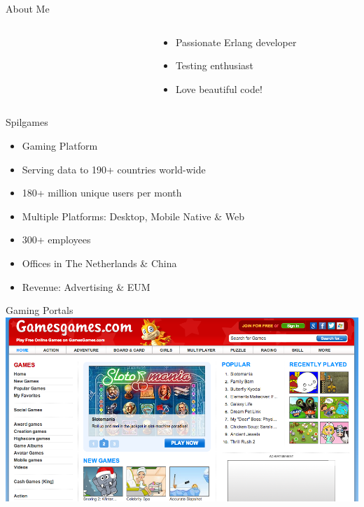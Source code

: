 \documentclass[aspectratio=169]{beamer}
\begin{document}
\begin{frame}{About Me}
\begin{columns}
\begin{column}[c]{0.2\textwidth}
        \end{column}
        \begin{column}[c]{0.05\textwidth}
        \end{column}
        \begin{column}[c]{0.7\textwidth}
            \begin{itemize}
                \item Passionate Erlang developer
                \item Testing enthusiast
                \item Love beautiful code!
            \end{itemize}
        \end{column}
    \end{columns}
\end{frame}

\begin{frame}{Spilgames}
    \begin{itemize}
       \item Gaming Platform
       \item Serving data to 190+ countries world-wide
       \item 180+ million unique users per month
       \item Multiple Platforms: Desktop, Mobile Native \& Web
       \item 300+ employees
       \item Offices in The Netherlands \& China
       \item Revenue: Advertising \& EUM
    \end{itemize}
\end{frame}

\begin{frame}{Gaming Portals}
    \includegraphics[width=\textwidth]{images/gamesgames.png}
\end{frame}
\end{document}
